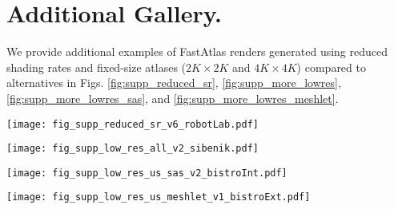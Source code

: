 \section{Additional Gallery.}

We provide additional examples of FastAtlas renders generated using reduced shading rates and fixed-size atlases ($2K \times 2K$ and $4K \times 4K$) compared to alternatives in Figs. \ref{fig:supp_reduced_sr}, \ref{fig:supp_more_lowres}, \ref{fig:supp_more_lowres_sas}, and \ref{fig:supp_more_lowres_meshlet}.

\begin{figure*}
   \texttt{[image: fig\_supp\_reduced\_sr\_v6\_robotLab.pdf]}
    \caption{Comparing FastAtlas to \cite{Neff2022MSA} and a forward upsampling baseline when targeting reduced shading rates. Here, all methods target a shading rate of 25\% ($0.25^2=0.0625$, or 6.5\% samples). The forward upsampling baseline (b) introduces jagged artifacts while \cite{Neff2022MSA} (c) exhibits undersampling (highlighted on zoomed images). FastAtlas (d) achieves the most similar results to ground truth forward rendering (a) and preserves important details even at a 25\% shading rate.}
    \label{fig:supp_reduced_sr}
\end{figure*}

\begin{figure*}
\texttt{[image: fig\_supp\_low\_res\_all\_v2\_sibenik.pdf]}
\caption{Additional comparisons with prior art ($2K \times 2K$ atlases). Left to right: reference forward render, static atlasing, SAS \cite{mueller2018shading}, MSA  \cite{Neff2022MSA}, FastAtlas. While all prior method outputs exhibit notable undersampling, our results remain visually close to forward rendering.}
\label{fig:supp_more_lowres}
\end{figure*}

\begin{figure*}
\texttt{[image: fig\_supp\_low\_res\_us\_sas\_v2\_bistroInt.pdf]}
\caption{Additional comparisons with SAS \cite{mueller2018shading} using $2K \times 2K$ atlases. Left to right: reference forward render, SAS \cite{mueller2018shading}, FastAtlas. While SAS outputs exhibit notable undersampling, our results remain visually close to forward rendering.}
\label{fig:supp_more_lowres_sas}
\end{figure*}

\begin{figure*}
\texttt{[image: fig\_supp\_low\_res\_us\_meshlet\_v1\_bistroExt.pdf]}
\caption{Additional comparisons with MSA \cite{Neff2022MSA} using $4K \times 4K$ atlases. Left to right: reference forward render, MSA-P \cite{Neff2022MSA}, FastAtlas. While MSA outputs exhibit notable undersampling and seam artifacts, our results remain visually close to forward rendering.}
\label{fig:supp_more_lowres_meshlet}
\end{figure*}

